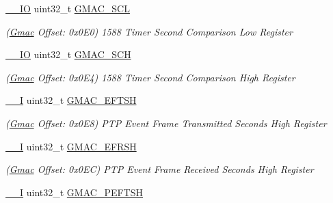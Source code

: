 \begin{DoxyCompactItemize}
\mbox{\hyperlink{core__cm7_8h_aec43007d9998a0a0e01faede4133d6be}{\+\_\+\+\_\+\+IO}} uint32\+\_\+t \mbox{\hyperlink{structGmac_a3cb87be2383c10f7e32d8adae25f3eae}{G\+M\+A\+C\+\_\+\+S\+CL}}
\begin{DoxyCompactList}\small\item\em (\mbox{\hyperlink{structGmac}{Gmac}} Offset\+: 0x0\+E0) 1588 Timer Second Comparison Low Register \end{DoxyCompactList}\item 
\mbox{\label{structGmac_a6b9d9569cada06d5f99912d6f30bf26c}} 
\mbox{\hyperlink{core__cm7_8h_aec43007d9998a0a0e01faede4133d6be}{\+\_\+\+\_\+\+IO}} uint32\+\_\+t \mbox{\hyperlink{structGmac_a6b9d9569cada06d5f99912d6f30bf26c}{G\+M\+A\+C\+\_\+\+S\+CH}}
\begin{DoxyCompactList}\small\item\em (\mbox{\hyperlink{structGmac}{Gmac}} Offset\+: 0x0\+E4) 1588 Timer Second Comparison High Register \end{DoxyCompactList}\item 
\mbox{\label{structGmac_a75099b38075549c01fb78544db0454d1}} 
\mbox{\hyperlink{core__cm7_8h_af63697ed9952cc71e1225efe205f6cd3}{\+\_\+\+\_\+I}} uint32\+\_\+t \mbox{\hyperlink{structGmac_a75099b38075549c01fb78544db0454d1}{G\+M\+A\+C\+\_\+\+E\+F\+T\+SH}}
\begin{DoxyCompactList}\small\item\em (\mbox{\hyperlink{structGmac}{Gmac}} Offset\+: 0x0\+E8) P\+TP Event Frame Transmitted Seconds High Register \end{DoxyCompactList}\item 
\mbox{\label{structGmac_a3eb9f6ab392ef6c7dc4a83972ba7b975}} 
\mbox{\hyperlink{core__cm7_8h_af63697ed9952cc71e1225efe205f6cd3}{\+\_\+\+\_\+I}} uint32\+\_\+t \mbox{\hyperlink{structGmac_a3eb9f6ab392ef6c7dc4a83972ba7b975}{G\+M\+A\+C\+\_\+\+E\+F\+R\+SH}}
\begin{DoxyCompactList}\small\item\em (\mbox{\hyperlink{structGmac}{Gmac}} Offset\+: 0x0\+EC) P\+TP Event Frame Received Seconds High Register \end{DoxyCompactList}\item 
\mbox{\label{structGmac_adcc8f51f527abd7bf0974b87fa750c1a}} 
\mbox{\hyperlink{core__cm7_8h_af63697ed9952cc71e1225efe205f6cd3}{\+\_\+\+\_\+I}} uint32\+\_\+t \mbox{\hyperlink{structGmac_adcc8f51f527abd7bf0974b87fa750c1a}{G\+M\+A\+C\+\_\+\+P\+E\+F\+T\+SH}}

\end{DoxyCompactItemize}
